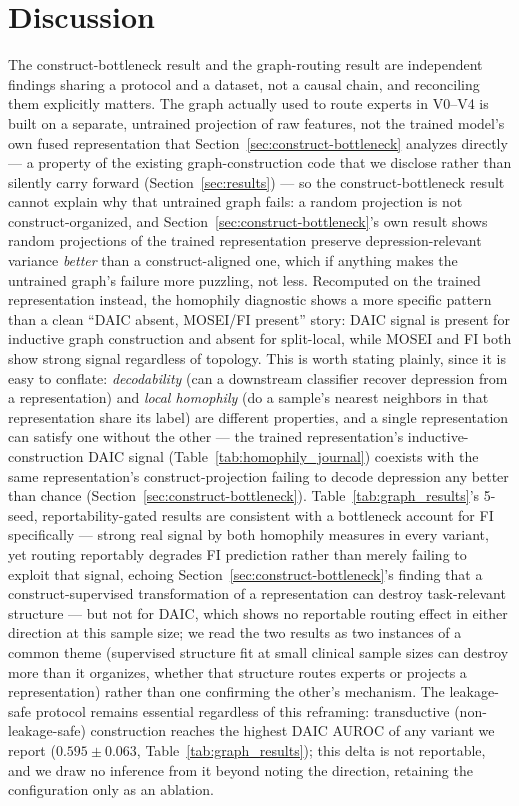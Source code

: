 \documentclass[twocolumn]{article}
\begin{document}
\section{Discussion}
\label{sec:discussion}

The construct-bottleneck result and the graph-routing result are independent findings sharing a protocol and a dataset, not a causal chain, and reconciling them explicitly matters. The graph actually used to route experts in V0--V4 is built on a separate, untrained projection of raw features, not the trained model's own fused representation that Section~\ref{sec:construct-bottleneck} analyzes directly — a property of the existing graph-construction code that we disclose rather than silently carry forward (Section~\ref{sec:results}) — so the construct-bottleneck result cannot explain why that untrained graph fails: a random projection is not construct-organized, and Section~\ref{sec:construct-bottleneck}'s own result shows random projections of the trained representation preserve depression-relevant variance \emph{better} than a construct-aligned one, which if anything makes the untrained graph's failure more puzzling, not less. Recomputed on the trained representation instead, the homophily diagnostic shows a more specific pattern than a clean ``DAIC absent, MOSEI/FI present'' story: DAIC signal is present for inductive graph construction and absent for split-local, while MOSEI and FI both show strong signal regardless of topology. This is worth stating plainly, since it is easy to conflate: \emph{decodability} (can a downstream classifier recover depression from a representation) and \emph{local homophily} (do a sample's nearest neighbors in that representation share its label) are different properties, and a single representation can satisfy one without the other — the trained representation's inductive-construction DAIC signal (Table~\ref{tab:homophily_journal}) coexists with the same representation's construct-projection failing to decode depression any better than chance (Section~\ref{sec:construct-bottleneck}). Table~\ref{tab:graph_results}'s 5-seed, reportability-gated results are consistent with a bottleneck account for FI specifically — strong real signal by both homophily measures in every variant, yet routing reportably degrades FI prediction rather than merely failing to exploit that signal, echoing Section~\ref{sec:construct-bottleneck}'s finding that a construct-supervised transformation of a representation can destroy task-relevant structure — but not for DAIC, which shows no reportable routing effect in either direction at this sample size; we read the two results as two instances of a common theme (supervised structure fit at small clinical sample sizes can destroy more than it organizes, whether that structure routes experts or projects a representation) rather than one confirming the other's mechanism. The leakage-safe protocol remains essential regardless of this reframing: transductive (non-leakage-safe) construction reaches the highest DAIC AUROC of any variant we report ($0.595\pm0.063$, Table~\ref{tab:graph_results}); this delta is not reportable, and we draw no inference from it beyond noting the direction, retaining the configuration only as an ablation. 
\end{document}

